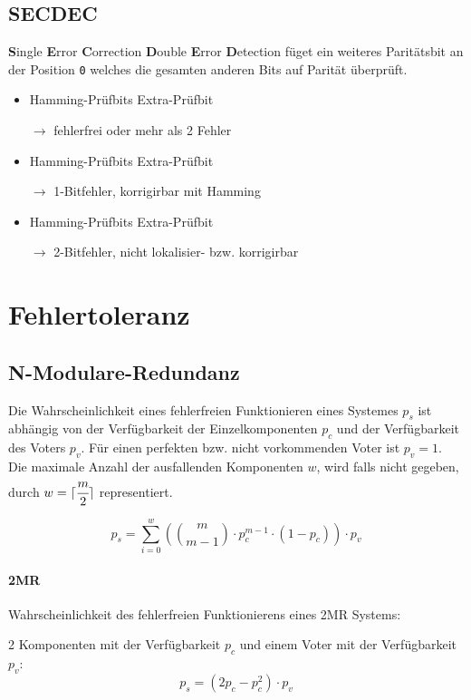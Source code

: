\documentclass[a4paper, landscape]{article}
\newcommand*\spaceline{\par\vspace{\belowdisplayskip}}
\newcommand{\cmark}{\ding{51}}
\newcommand{\xmark}{\ding{55}}
\begin{document}
\begin{multicols}{3}
        \subsection{SECDEC}
        \textbf{S}ingle \textbf{E}rror \textbf{C}orrection \textbf{D}ouble \textbf{E}rror \textbf{D}etection füget ein weiteres Paritätsbit an der Position \texttt{0} welches die gesamten anderen Bits auf Parität überprüft. \spaceline
        \begin{itemize}
         \item Hamming-Prüfbits \cmark \quad Extra-Prüfbit \cmark\par
         $\longrightarrow$ fehlerfrei oder mehr als 2 Fehler
         \item Hamming-Prüfbits \xmark \quad Extra-Prüfbit \xmark\par
         $\longrightarrow$ 1-Bitfehler, korrigirbar mit Hamming
         \item Hamming-Prüfbits \xmark \quad Extra-Prüfbit \cmark\par
         $\longrightarrow$ 2-Bitfehler, nicht lokalisier- bzw. korrigirbar
        \end{itemize}

        
        \section{Fehlertoleranz}
        
        \subsection{N-Modulare-Redundanz}
        Die Wahrscheinlichkeit eines fehlerfreien Funktionieren eines Systemes $p_{s}$ ist abhängig von der Verfügbarkeit der Einzelkomponenten $p_{c}$ und der Verfügbarkeit des Voters $p_{v}$. Für einen perfekten bzw. nicht vorkommenden Voter ist $p_{v} = 1$.
        Die maximale Anzahl der ausfallenden Komponenten $w$, wird falls nicht gegeben, durch $w = \lceil \cfrac{m}{2} \rceil$ representiert.
        
        \[
         p_{s} = \sum_{i = 0}^{w} \left( \binom{m}{m - 1} \cdot p_{c}^{m - 1} \cdot (1 - p_{c}) \right) \cdot p_{v}
        \]

        \paragraph{2MR} Wahrscheinlichkeit des fehlerfreien Funktionierens eines 2MR Systems:\par 
        2 Komponenten mit der Verfügbarkeit $p_{c}$ und einem Voter mit der Verfügbarkeit $p_{v}$:
        \[
         p_{s} = \left(2 p_{c} - p_{c}^{2} \right) \cdot p_{v}
        \]
        

\end{multicols}
\end{document}

